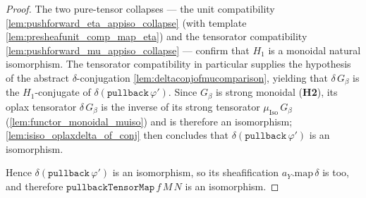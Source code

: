 \begin{proof}
  The two pure-tensor collapses --- the unit compatibility
  \cref{lem:pushforward_eta_appiso_collapse} (with template \cref{lem:presheafunit_comp_map_eta})
  and the tensorator compatibility \cref{lem:pushforward_mu_appiso_collapse} --- confirm that
  \(H_1\) is a monoidal natural isomorphism. The tensorator compatibility in particular supplies
  the hypothesis of the abstract \(\delta\)-conjugation \cref{lem:deltaconjofmucomparison},
  yielding that \(\delta\,G_\beta\) is the \(H_1\)-conjugate of
  \(\delta(\mathtt{pullback}\,\varphi')\). Since \(G_\beta\) is strong monoidal (\textbf{H2}),
  its oplax tensorator \(\delta\,G_\beta\) is the inverse of its strong tensorator
  \(\mu_{\mathrm{Iso}}\,G_\beta\) (\cref{lem:functor_monoidal_muiso}) and is therefore an
  isomorphism; \cref{lem:isiso_oplaxdelta_of_conj} then concludes that
  \(\delta(\mathtt{pullback}\,\varphi')\) is an isomorphism.

  Hence \(\delta(\mathtt{pullback}\,\varphi')\) is an isomorphism, so
  its sheafification \(a_Y.\mathrm{map}\,\delta\) is too, and therefore
  \(\mathtt{pullbackTensorMap}\,f\,M\,N\) is an isomorphism.
\end{proof}

